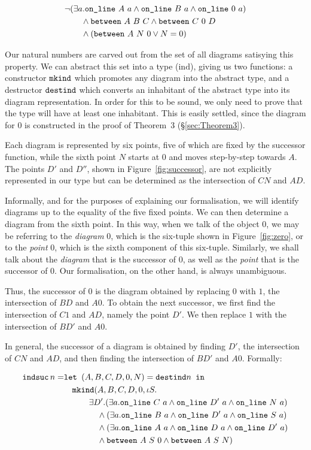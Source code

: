 \begin{align}
&\neg(\exists a.\texttt{on\_line}\ A\ a\wedge \texttt{on\_line}\ B\ a\wedge \texttt{on\_line}\ 0\ a) \label{theorem:IndConstraint}\\
&\qquad\wedge \texttt{between}\ A\ B\ C \wedge \texttt{between}\ C\ 0\ D\notag\\
&\qquad\wedge (\texttt{between}\ A\ N\ 0 \vee N = 0)\notag
\end{align}

Our natural numbers are carved out from the set of all diagrams satisying this property. We can abstract this set into a type ($\text{ind}$), giving us two functions: a constructor $\texttt{mkind}$ which promotes any diagram into the abstract type, and a destructor $\texttt{destind}$ which converts an inhabitant of the abstract type into its diagram representation. In order for this to be sound, we only need to prove that the type will have at least one inhabitant. This is easily settled, since the diagram for $0$ is constructed in the proof of Theorem~3 (\S\ref{sec:Theorem3}). 

Each diagram is represented by six points, five of which are fixed by the successor function, while the sixth point $N$ starts at $0$ and moves step-by-step towards $A$. The points $D'$ and $D''$, shown in Figure~\ref{fig:successor}, are not explicitly represented in our type but can be determined as the intersection of $CN$ and $AD$.

Informally, and for the purposes of explaining our formalisation, we will identify diagrams up to the equality of the five fixed points. We can then determine a diagram from the sixth point. In this way, when we talk of the object $0$, we may be referring to the \emph{diagram} 0, which is the six-tuple shown in Figure~\ref{fig:zero}, or to the \emph{point} 0, which is the sixth component of this six-tuple. Similarly, we shall talk about the \emph{diagram} that is the successor of 0, as well as the \emph{point} that is the successor of 0. Our formalisation, on the other hand, is always unambiguous.

Thus, the successor of $0$ is the diagram obtained by replacing $0$ with $1$, the intersection of $BD$ and $A0$. To obtain the next successor, we first find the intersection of $C1$ and $AD$, namely the point $D'$. We then replace $1$ with the intersection of $BD'$ and $A0$. 

In general, the successor of a diagram is obtained by finding $D'$, the intersection of $CN$ and $AD$, and then finding the intersection of $BD'$ and $A0$. Formally:

\begin{align*}
\texttt{indsuc}\, n =& \texttt{let } (A,B,C,D,0,N) = \texttt{destind} n \texttt{ in}\\
&\quad \texttt{mkind} (A,B,C,D,0,\iota S.\\
&\quad\qquad \exists D'. (\exists a. \texttt{on\_line}\ C\ a \wedge \texttt{on\_line}\ D'\ a \wedge \texttt{on\_line}\ N\ a)\\
&\qquad\qquad \wedge (\exists a. \texttt{on\_line}\ B\ a \wedge \texttt{on\_line}\ D'\ a \wedge \texttt{on\_line}\ S\ a)\\
&\qquad\qquad \wedge (\exists a. \texttt{on\_line}\ A\ a \wedge \texttt{on\_line}\ D\ a \wedge \texttt{on\_line}\ D'\ a)\\
&\qquad\qquad \wedge \texttt{between}\ A\ S\ 0 \wedge \texttt{between}\ A\ S\ N)
\end{align*}

